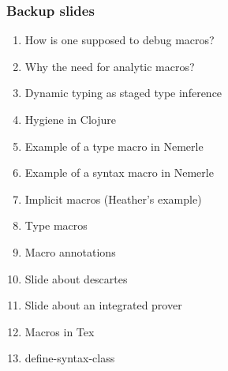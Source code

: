 \documentclass[hyperref={bookmarks=false}]{beamer}
\begin{document}
\begin{frame}[fragile]
\frametitle{Backup slides}
\begin{enumerate}
\item How is one supposed to debug macros?
\item Why the need for analytic macros?
\item Dynamic typing as staged type inference
\item Hygiene in Clojure
\item Example of a type macro in Nemerle
\item Example of a syntax macro in Nemerle
\item Implicit macros (Heather's example)
\item Type macros
\item Macro annotations
\item Slide about descartes
\item Slide about an integrated prover
\item Macros in Tex
\item define-syntax-class
\end{enumerate}
\end{frame}
\end{document}
